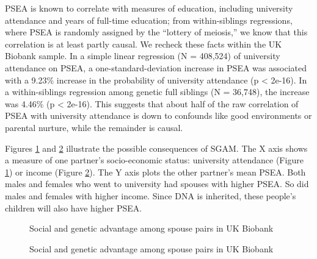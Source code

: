 \documentclass[
]{article}
\begin{document}
PSEA is known to correlate with measures of education, including
university attendance and years of full-time education; from
within-siblings regressions, where PSEA is randomly assigned by the
``lottery of meiosis,'' we know that this correlation is at least partly
causal. We recheck these facts within the UK Biobank sample. In a simple
linear regression (N = 408,524) of university attendance
on PSEA, a one-standard-deviation increase in PSEA was associated with a
9.23\% increase in the probability of
university attendance (p \textless{} 2e-16). In a within-siblings regression
among genetic full siblings (N = 36,748), the
increase was 4.46\% (p \textless{} 2e-16). This
suggests that about half of the raw correlation of PSEA with university
attendance is down to confounds like good environments or parental
nurture, while the remainder is causal.

Figures \ref{fig:pic-basic-corr-uni} and
\ref{fig:pic-basic-corr-income} illustrate the possible consequences of
SGAM. The X axis shows a measure of one partner's socio-economic status:
university attendance (Figure \ref{fig:pic-basic-corr-uni}) or income
(Figure \ref{fig:pic-basic-corr-income}). The Y axis plots the other
partner's mean PSEA. Both males and females who went to university had
spouses with higher PSEA. So did males and females with higher income.
Since DNA is inherited, these people's children will also have higher
PSEA.

\begin{figure}
\caption{Social and genetic advantage among spouse pairs in UK Biobank}\label{fig:pic-basic-corr-uni}
\end{figure}

\begin{figure}
\caption{Social and genetic advantage among spouse pairs in UK Biobank}\label{fig:pic-basic-corr-income}
\end{figure}
\end{document}

